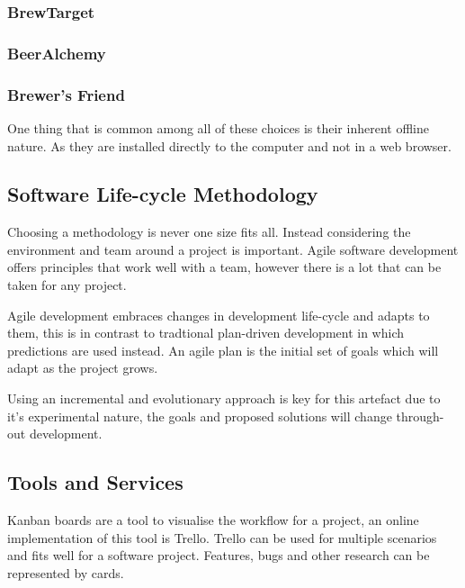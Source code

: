 \subsubsection{BrewTarget}
\subsubsection{BeerAlchemy}
\subsubsection{Brewer's Friend}


One thing that is common among all of these choices is their inherent offline nature. As they are installed directly to the computer and not in a web browser.

\subsection{Software Life-cycle Methodology} \label{a-d--methodology--life-cycle}

Choosing a methodology is never one size fits all. Instead considering the environment and team around a project is important. Agile software development offers principles that work well with a team, however there is a lot that can be taken for any project.

Agile development embraces changes in development life-cycle and adapts to them, this is in contrast to tradtional plan-driven development in which predictions are used instead. An agile plan is the initial set of goals which will adapt as the project grows. \cite{fowler_agile}

Using an incremental and evolutionary approach is key for this artefact due to it's experimental nature, the goals and proposed solutions will change through-out development.

\subsection{Tools and Services} \label{a-d--methodology--tools}

Kanban boards are a tool to visualise the workflow for a project, an online implementation of this tool is Trello. Trello can be used for multiple scenarios and fits well for a software project. Features, bugs and other research can be represented by cards. \cite{trello} %


